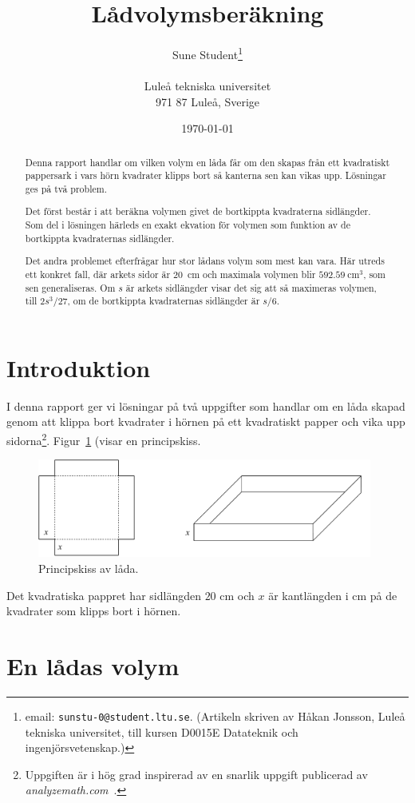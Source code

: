 \documentclass[a4paper,12pt]{article}
\title{Lådvolymsberäkning}
\author{Sune Student\thanks{email:
        \texttt{sunstu-0@student.ltu.se}. (Artikeln skriven av Håkan
        Jonsson, Luleå tekniska universitet, till kursen D0015E
        Datateknik och ingenjörsvetenskap.)} \\
        ~ \\
        Luleå tekniska universitet \\
        971 87 Luleå, Sverige}
\date{\today}
\begin{document}
\linenumbers %
\maketitle

\begin{abstract}
  Denna rapport handlar om vilken volym en låda får om den skapas från
  ett kvadratiskt pappersark i vars hörn kvadrater klipps bort så
  kanterna sen kan vikas upp. Lösningar ges på två problem.
  
  Det först består i att beräkna volymen givet de bortkippta
  kvadraterna sidlängder. Som del i lösningen härleds en exakt
  ekvation för volymen som funktion av de bortkippta kvadraternas
  sidlängder. 
  
  Det andra problemet efterfrågar hur stor lådans volym som mest kan
  vara. Här utreds ett konkret fall, där arkets sidor är $20$~cm
  och maximala volymen blir $592.59~\text{cm}^3$, som sen
  generaliseras. Om $s$ är arkets sidlängder visar det sig att så
  maximeras volymen, till $2s^3/27$, om de bortkippta kvadraternas
  sidlängder är $s/6$. 
\end{abstract}

\section{Introduktion}

I denna rapport ger vi lösningar på två uppgifter som handlar om en
låda skapad genom att klippa bort kvadrater i hörnen på ett kvadratiskt
papper och vika upp sidorna\footnote{Uppgiften är i hög grad
inspirerad av en snarlik uppgift publicerad av
\emph{analyzemath.com}~\cite{webbsida}.}. Figur~\ref{fig:box} (visar en
principskiss. 
%
\begin{figure}[tbh]
  \centering
  \includegraphics[width=11cm]{box.pdf}
  \caption{Principskiss av låda.} 
  \label{fig:box}
\end{figure}
%
Det kvadratiska pappret har sidlängden $20$ cm och $x$ är kantlängden i
cm på de kvadrater som klipps bort i hörnen. 

\section{En lådas volym} \label{sec:v}
\end{document}
